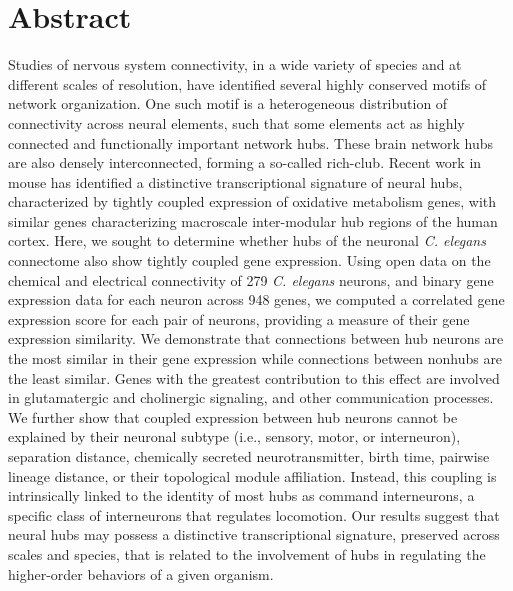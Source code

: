\documentclass[10pt,letterpaper]{article}
\begin{document}
\section*{Abstract}
Studies of nervous system connectivity, in a wide variety of species and at different scales of resolution, have identified several highly conserved motifs of network organization.
One such motif is a heterogeneous distribution of connectivity across neural elements, such that some elements act as highly connected and functionally important network hubs.
These brain network hubs are also densely interconnected, forming a so-called rich-club.
Recent work in mouse has identified a distinctive transcriptional signature of neural hubs, characterized by tightly coupled expression of oxidative metabolism genes, with similar genes characterizing macroscale inter-modular hub regions of the human cortex.
Here, we sought to determine whether hubs of the neuronal \textit{C. elegans} connectome also show tightly coupled gene expression.
Using open data on the chemical and electrical connectivity of 279 \textit{C. elegans} neurons, and binary gene expression data for each neuron across 948 genes, we computed a correlated gene expression score for each pair of neurons, providing a measure of their gene expression similarity.
We demonstrate that connections between hub neurons are the most similar in their gene expression while connections between nonhubs are the least similar.
Genes with the greatest contribution to this effect are involved in glutamatergic and cholinergic signaling, and other communication processes.
We further show that coupled expression between hub neurons cannot be explained by their neuronal subtype (i.e., sensory, motor, or interneuron), separation distance, chemically secreted neurotransmitter, birth time, pairwise lineage distance, or their topological module affiliation.
Instead, this coupling is intrinsically linked to the identity of most hubs as command interneurons, a specific class of interneurons that regulates locomotion.
Our results suggest that neural hubs may possess a distinctive transcriptional signature, preserved across scales and species, that is related to the involvement of hubs in regulating the higher-order behaviors of a given organism.
\end{document}
